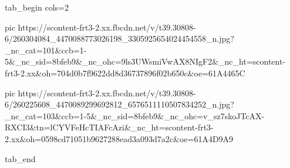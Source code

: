  
 
 
 
 


\ifcmt
  tab_begin cols=2

     pic https://scontent-frt3-2.xx.fbcdn.net/v/t39.30808-6/260304084_4470088773026198_3305925654024454558_n.jpg?_nc_cat=101&ccb=1-5&_nc_sid=8bfeb9&_nc_ohc=9ls3UWsmiVwAX8NIgF2&_nc_ht=scontent-frt3-2.xx&oh=704d0b7f9622dd8d36737896f02b650c&oe=61A4465C

     pic https://scontent-frt3-2.xx.fbcdn.net/v/t39.30808-6/260225608_4470089299692812_6576511110507834252_n.jpg?_nc_cat=103&ccb=1-5&_nc_sid=8bfeb9&_nc_ohc=v_sz7skoJTcAX-RXCI3&tn=lCYVFeHcTIAFcAzi&_nc_ht=scontent-frt3-2.xx&oh=0598cd71051b9627288ead3a093d7a2c&oe=61A4D9A9

  tab_end
\fi
